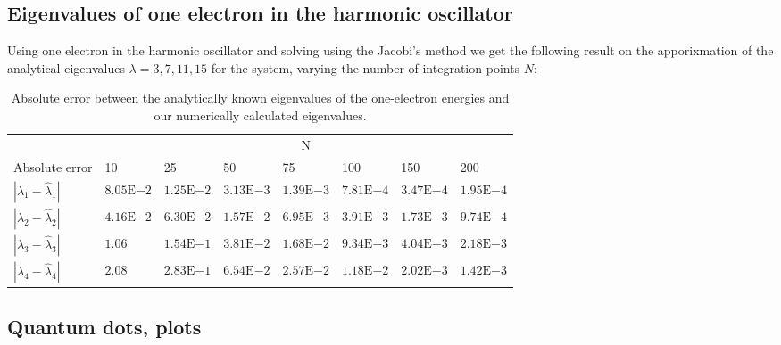 \documentclass[a4paper, fontsize=11pt]{article}
\begin{document}
\subsection{Eigenvalues of one electron in the harmonic oscillator}

Using one electron in the harmonic oscillator and solving using the Jacobi's method we get the following result on the apporixmation of the analytical eigenvalues $\lambda = 3, 7, 11, 15$ for the system, varying the number of integration points $N$:

\begin{table}[htp]
\begin{center}
\begin{tabular}{@{}llllllll@{}}
\toprule
     & \multicolumn{7}{c}{N}               \\ \cmidrule(l){2-8} 
Absolute error & 10 & 25 & 50 & 75 & 100 & 150 & 200 \\ \midrule
$|\lambda_1 - \hat{\lambda}_1|$    &    $8.05\mathrm{E}{-2}$&    $1.25\mathrm{E}{-2}$&    $3.13\mathrm{E}{-3}$&    $1.39\mathrm{E}{-3}$&     $7.81\mathrm{E}{-4}$&     $3.47\mathrm{E}{-4}$&      $1.95\mathrm{E}{-4}$\\
$|\lambda_2 - \hat{\lambda}_2|$    &    $4.16\mathrm{E}{-2}$&    $6.30\mathrm{E}{-2}$&    $1.57\mathrm{E}{-2}$&    $6.95\mathrm{E}{-3}$&     $3.91\mathrm{E}{-3}$&     $1.73\mathrm{E}{-3}$&      $9.74\mathrm{E}{-4}$\\
$|\lambda_3 - \hat{\lambda}_3|$    &    $1.06$&    $1.54\mathrm{E}{-1}$&    $3.81\mathrm{E}{-2}$&    $1.68\mathrm{E}{-2}$&     $9.34\mathrm{E}{-3}$&     $4.04\mathrm{E}{-3}$&     $2.18\mathrm{E}{-3}$\\
$|\lambda_4 - \hat{\lambda}_4|$    &    $2.08$&    $2.83\mathrm{E}{-1}$&    $6.54\mathrm{E}{-2}$&    $2.57\mathrm{E}{-2}$&     $1.18\mathrm{E}{-2}$&     $2.02\mathrm{E}{-3}$&     $1.42\mathrm{E}{-3}$\\ \bottomrule
\end{tabular}
\caption{Absolute error between the analytically known eigenvalues of the one-electron energies and our numerically calculated eigenvalues.}
\end{center}
\end{table}


\subsection{Quantum dots, plots}


\end{document}
